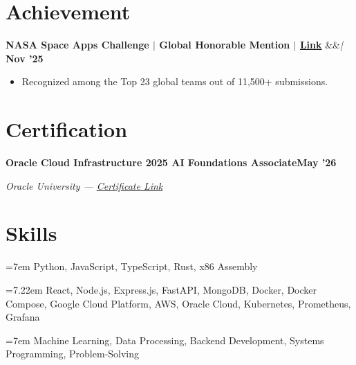 \documentclass[letterpaper, 11pt]{article}
\newcommand{\cventry}[3]{%
  \noindent
  \textbf{#1}%
  \ifx&#2&\else\enspace\textit{| #2}\fi%
  \hfill\textbf{#3}\par
  \vspace{1pt}%
}
\newcommand{\certentry}[3]{%
  \noindent\textbf{#1}\hfill #2\par
  \noindent\textit{#3}\par
  \vspace{3pt}%
}
\begin{document}
\section{Achievement}

\cventry{NASA Space Apps Challenge $|$ Global Honorable Mention $|$ \href{https://drive.google.com/file/d/1RZ63Tk5zmSds2Rza-F8y-gWo6T2NvS6H/view?usp=sharing}{Link}}{}{Nov '25}
\begin{itemize}
  \item Recognized among the Top 23 global teams out of 11,500+ submissions.
\end{itemize}

\vspace{3pt}

\section{Certification}

\certentry{Oracle Cloud Infrastructure 2025 AI Foundations Associate}{\textbf{May '26}}{Oracle University --- \href{https://drive.google.com/file/d/1lEJNc8hZzfi4_6DZr4nOwpJpimiurhfn/view?usp=sharing}{Certificate Link}}

\section{Skills}


\hangindent=7em
\noindent{} Python, JavaScript, TypeScript, Rust, x86 Assembly\par
\vspace{2pt}
\hangindent=7.22em
\noindent{} React, Node.js, Express.js, FastAPI, MongoDB, Docker, Docker Compose, Google Cloud Platform, AWS, Oracle Cloud, Kubernetes, Prometheus, Grafana\par
\vspace{2pt}
\hangindent=7em
\noindent{} Machine Learning, Data Processing, Backend Development, Systems Programming, Problem-Solving
\end{document}
